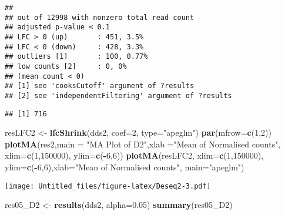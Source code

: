 \documentclass[]{article}
\newenvironment{Shaded}{\begin{snugshade}}{\end{snugshade}}
\newcommand{\DataTypeTok}[1]{\textcolor[rgb]{0.13,0.29,0.53}{#1}}
\newcommand{\DecValTok}[1]{\textcolor[rgb]{0.00,0.00,0.81}{#1}}
\newcommand{\FloatTok}[1]{\textcolor[rgb]{0.00,0.00,0.81}{#1}}
\newcommand{\KeywordTok}[1]{\textcolor[rgb]{0.13,0.29,0.53}{\textbf{#1}}}
\newcommand{\NormalTok}[1]{#1}
\newcommand{\OperatorTok}[1]{\textcolor[rgb]{0.81,0.36,0.00}{\textbf{#1}}}
\newcommand{\OtherTok}[1]{\textcolor[rgb]{0.56,0.35,0.01}{#1}}
\newcommand{\StringTok}[1]{\textcolor[rgb]{0.31,0.60,0.02}{#1}}
\begin{document}
\begin{verbatim}
## 
## out of 12998 with nonzero total read count
## adjusted p-value < 0.1
## LFC > 0 (up)       : 451, 3.5%
## LFC < 0 (down)     : 428, 3.3%
## outliers [1]       : 100, 0.77%
## low counts [2]     : 0, 0%
## (mean count < 0)
## [1] see 'cooksCutoff' argument of ?results
## [2] see 'independentFiltering' argument of ?results
\end{verbatim}

\begin{Shaded}
\end{Shaded}

\begin{verbatim}
## [1] 716
\end{verbatim}

\begin{Shaded}
\begin{Highlighting}[]
\NormalTok{resLFC2 <-}\StringTok{ }\KeywordTok{lfcShrink}\NormalTok{(dds2, }\DataTypeTok{coef=}\DecValTok{2}\NormalTok{, }\DataTypeTok{type=}\StringTok{"apeglm"}\NormalTok{)}
\KeywordTok{par}\NormalTok{(}\DataTypeTok{mfrow=}\KeywordTok{c}\NormalTok{(}\DecValTok{1}\NormalTok{,}\DecValTok{2}\NormalTok{))}
\KeywordTok{plotMA}\NormalTok{(res2,}\DataTypeTok{main =} \StringTok{"MA Plot of D2"}\NormalTok{,}\DataTypeTok{xlab =}\StringTok{"Mean of Normalised counts"}\NormalTok{, }\DataTypeTok{xlim=}\KeywordTok{c}\NormalTok{(}\DecValTok{1}\NormalTok{,}\DecValTok{150000}\NormalTok{), }\DataTypeTok{ylim=}\KeywordTok{c}\NormalTok{(}\OperatorTok{-}\DecValTok{6}\NormalTok{,}\DecValTok{6}\NormalTok{))}
\KeywordTok{plotMA}\NormalTok{(resLFC2, }\DataTypeTok{xlim=}\KeywordTok{c}\NormalTok{(}\DecValTok{1}\NormalTok{,}\DecValTok{150000}\NormalTok{), }\DataTypeTok{ylim=}\KeywordTok{c}\NormalTok{(}\OperatorTok{-}\DecValTok{6}\NormalTok{,}\DecValTok{6}\NormalTok{),}\DataTypeTok{xlab=}\StringTok{"Mean of Normalised counts"}\NormalTok{, }\DataTypeTok{main=}\StringTok{"apeglm"}\NormalTok{)}
\end{Highlighting}
\end{Shaded}

\texttt{[image: Untitled\_files/figure-latex/Deseq2-3.pdf]}

\begin{Shaded}
\begin{Highlighting}[]
\NormalTok{res05_D2 <-}\StringTok{ }\KeywordTok{results}\NormalTok{(dds2, }\DataTypeTok{alpha=}\FloatTok{0.05}\NormalTok{)}
\KeywordTok{summary}\NormalTok{(res05_D2)}
\end{Highlighting}
\end{Shaded}
\end{document}
